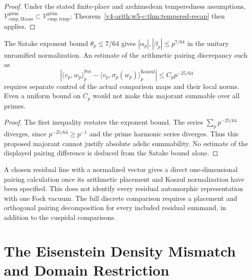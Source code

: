 \begin{proof}
Under the stated finite-place and archimedean temperedness assumptions, \(\mathcal{V}^{\mathrm{prim}}_{\mathrm{cusp,Maass}}\subset\mathcal{V}^{\mathrm{prim}}_{\mathrm{cusp,temp}}\);
Theorem~\ref{v4-arith:w5-c:thm:tempered-recap} then applies.
\end{proof}

\begin{proposition}
\label{v4-arith:w5-c:prop:KS-partial}
The Satake exponent bound \(\theta_p\leq7/64\) gives
\(|\alpha_p|,|\beta_p|\leq p^{7/64}\) in the unitary unramified
normalization. An estimate of the arithmetic pairing discrepancy
such as
\begin{equation}
\label{v4-arith:w5-c:eq:KS-local}
\left|\langle v_p,w_p\rangle^{\mathrm{Pet}}_p
-\langle v_p,\sigma_p(w_p)\rangle^{\mathrm{Koszul}}_p\right|
\leq C_p p^{-25/64}
\end{equation}
requires separate control of the actual comparison maps and their
local norms. Even a uniform bound on \(C_p\) would not make this
majorant summable over all primes.
\end{proposition}
\begin{proof}
The first inequality restates the exponent bound. The series
\(\sum_p p^{-25/64}\) diverges, since \(p^{-25/64}\geq p^{-1}\)
and the prime harmonic series diverges. Thus this proposed
majorant cannot justify absolute adelic summability. No estimate
of the displayed pairing difference is deduced from the Satake
bound alone.
\end{proof}

\begin{remark}
\label{v4-arith:w5-c:rem:CAP-residual}
A chosen residual line with a normalized vector gives a direct
one-dimensional pairing calculation once its arithmetic placement
and Koszul normalization have been specified. This does not
identify every residual automorphic representation with one Fock
vacuum. The full discrete comparison requires a placement and
orthogonal pairing decomposition for every included residual
summand, in addition to the cuspidal comparisons.
\end{remark}

\section{The Eisenstein Density Mismatch and Domain Restriction}
\label{v4-arith:w5-c:eisenstein}

